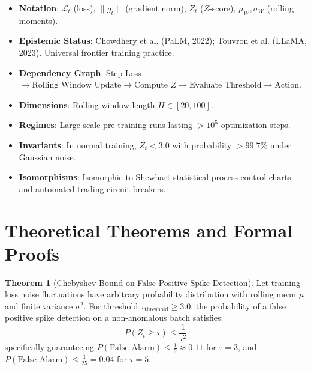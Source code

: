 \documentclass[11pt,a4paper]{article}
\theoremstyle{definition}
\newtheorem{theorem}{\textbf{Theorem}}[section]
\begin{document}
\begin{itemize}
    \item \textbf{Notation}: $\mathcal{L}_t$ (loss), $\|g_t\|$ (gradient norm), $Z_t$ ($Z$-score), $\mu_W, \sigma_W$ (rolling moments).
    \item \textbf{Epistemic Status}: Chowdhery et al. (PaLM, 2022); Touvron et al. (LLaMA, 2023). Universal frontier training practice.
    \item \textbf{Dependency Graph}: Step Loss $\to \text{Rolling Window Update} \to \text{Compute } Z \to \text{Evaluate Threshold} \to \text{Action}$.
    \item \textbf{Dimensions}: Rolling window length $H \in [20, 100]$.
    \item \textbf{Regimes}: Large-scale pre-training runs lasting $>10^5$ optimization steps.
    \item \textbf{Invariants}: In normal training, $Z_t < 3.0$ with probability $>99.7\%$ under Gaussian noise.
    \item \textbf{Isomorphisms}: Isomorphic to Shewhart statistical process control charts and automated trading circuit breakers.
\end{itemize}

\section{Theoretical Theorems and Formal Proofs}

\begin{theorem}[Chebyshev Bound on False Positive Spike Detection]
Let training loss noise fluctuations have arbitrary probability distribution with rolling mean $\mu$ and finite variance $\sigma^2$. For threshold $\tau_{\text{threshold}} \ge 3.0$, the probability of a false positive spike detection on a non-anomalous batch satisfies:
{\boldmath
\begin{equation}
P\left( Z_t \ge \tau \right) \le \frac{1}{\tau^2}
\end{equation}
}
specifically guaranteeing $P(\text{False Alarm}) \le \frac{1}{9} \approx 0.11$ for $\tau = 3$, and $P(\text{False Alarm}) \le \frac{1}{25} = 0.04$ for $\tau = 5$.
\end{theorem}
\end{document}

